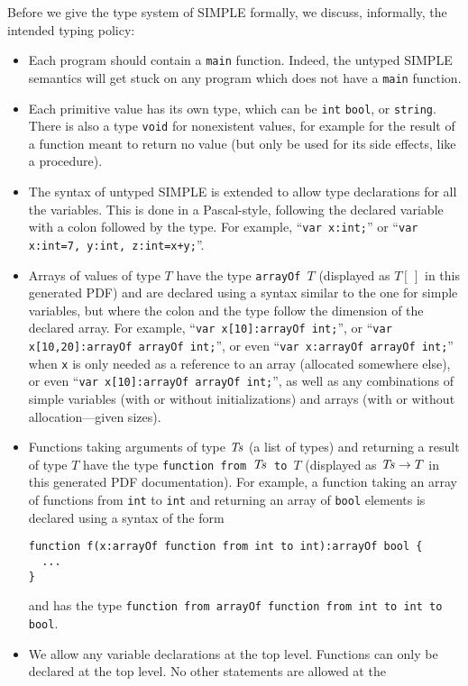 \begin{latexComment}
Before we give the \K type system of SIMPLE formally, we discuss, informally,
the intended typing policy:
\begin{itemize}
\item Each program should contain a \texttt{main} function.  Indeed, the
untyped SIMPLE semantics will get stuck on any program which does not have a
\texttt{main} function.
\item Each primitive value has its own type, which can be \texttt{int}
\texttt{bool}, or \texttt{string}.  There is also a type \texttt{void} for
nonexistent values, for example for the result of a function meant to return
no value (but only be used for its side effects, like a procedure).
\item The syntax of untyped SIMPLE is extended to allow type declarations for
all the variables.  This is done in a Pascal-style, following the declared
variable with a colon followed by the type.  For example,
``\texttt{var x:int;}'' or ``\texttt{var x:int=7, y:int, z:int=x+y;}''.
\item Arrays of values of type $T$ have the type \texttt{arrayOf $T$}
(displayed as $T[\,]$ in this generated PDF) and are declared using a
syntax similar to the one for simple variables, but where the colon
and the type follow the dimension of the declared array.
For example, ``\texttt{var x[10]:arrayOf int;}'', or
``\texttt{var x[10,20]:arrayOf arrayOf int;}'', or even
``\texttt{var x:arrayOf arrayOf int;}'' when \texttt{x} is only needed
as a reference to an array (allocated somewhere else), or even
``\texttt{var x[10]:arrayOf arrayOf int;}'', as well as any combinations of
simple variables (with or without initializations) and arrays (with or without
allocation---given sizes).
\item Functions taking arguments of type $\it Ts$ (a list of types) and
returning a result of type $T$ have the type
\texttt{function from $\it Ts$ to $T$} (displayed as ${\it Ts}\rightarrow T$
in this generated PDF documentation).  For example, a function taking an
array of functions from \texttt{int} to \texttt{int} and returning an array
of \texttt{bool} elements is declared using a syntax of the form
\begin{verbatim}
function f(x:arrayOf function from int to int):arrayOf bool {
  ...
}
\end{verbatim}
and has the type
\texttt{function from arrayOf function from int to int to bool}.
\item We allow any variable declarations at the top level.  Functions can
only be declared at the top level.  No other statements are allowed at the

\end{itemize}
\end{latexComment}
